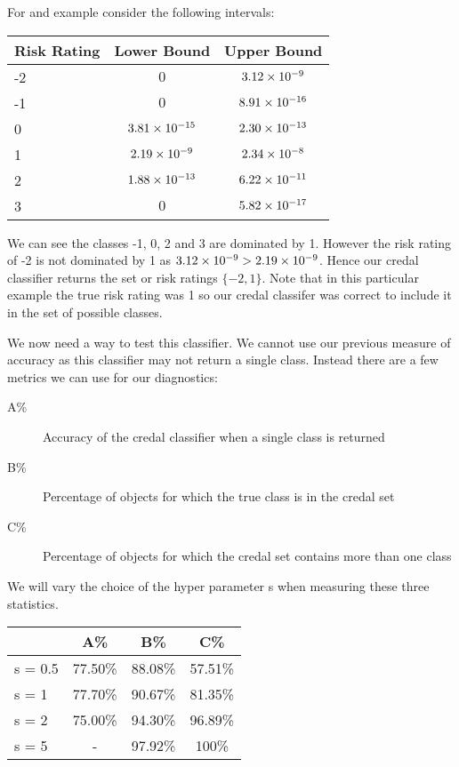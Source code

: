 For and example consider the following intervals:
\begin{center}
	\begin{tabular}{l|c c}
	Risk Rating & Lower Bound & Upper Bound \\
	\hline
	-2          & $0$              & ${3.12}\times 10^{-9}$  \\
	-1          & $0$              & ${8.91}\times 10^{-16}$ \\
	0           & ${3.81}\times 10^{-15}$ & ${2.30}\times 10^{-13}$ \\
	1           & ${2.19}\times 10^{-9}$  & ${2.34}\times 10^{-8}$  \\
	2           & ${1.88}\times 10^{-13}$ & ${6.22}\times 10^{-11}$ \\
	3           & $0$              & ${5.82}\times 10^{-17}$ \\
	\end{tabular}
\end{center}
We can see the classes -1, 0, 2 and 3 are dominated by 1.
However the risk rating of -2 is not dominated by 1 as ${3.12}\times 10^{-9} > {2.19}\times 10^{-9}$.
Hence our credal classifier returns the set or risk ratings $\{-2, 1\}$.
Note that in this particular example the true risk rating was 1 so our credal classifer was correct to include it in the set of possible classes.

We now need a way to test this classifier.
We cannot use our previous measure of accuracy as this classifier may not return a single class.
Instead there are a few metrics we can use for our diagnostics:
\begin{description}
	\item[A\%] Accuracy of the credal classifier when a single class is returned
	\item[B\%] Percentage of objects for which the true class is in the credal set
	\item[C\%] Percentage of objects for which the credal set contains more than one class
\end{description}

We will vary the choice of the hyper parameter s when measuring these three statistics.
\begin{center}
\begin{tabular}{l|c c c}
        & A\%     & B\%     & C\%     \\
\hline
s = 0.5 & 77.50\% & 88.08\% & 57.51\% \\
s = 1   & 77.70\% & 90.67\% & 81.35\% \\
s = 2   & 75.00\% & 94.30\% & 96.89\% \\
s = 5   & -       & 97.92\% & 100\%   \\
\end{tabular}
\end{center}

